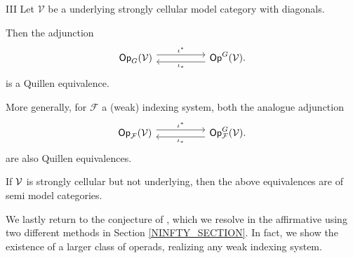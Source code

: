 \documentclass[a4paper,10pt]{article}%
\begin{document}
\begin{customthm}{III}\label{MAINQUILLENEQUIV THM}
Let $\mathcal{V}$ be a underlying strongly cellular model category with diagonals.

Then the adjunction 
\begin{equation}
\begin{tikzcd}[column sep =5em]
	\mathsf{Op}_G(\mathcal{V}) \ar[shift left=1.5]{r}{\iota^{\**}} 
	&
	\mathsf{Op}^G(\mathcal{V})
	\ar[shift left=1.5]{l}{\iota_{\**}} .
\end{tikzcd}
\end{equation}
is a Quillen equivalence.

More generally, for $\mathcal{F}$ a (weak) indexing system, both
the analogue adjunction
\begin{equation}
      \begin{tikzcd}[column sep =5em]
            \mathsf{Op}_{\mathcal F}(\mathcal{V}) 
            \ar[shift left=1.5]{r}{\iota^{\**}} 
            &
            \mathsf{Op}^G_{\mathcal{F}}(\mathcal{V})
            \ar[shift left=1.5]{l}{\iota_{\**}} .
      \end{tikzcd}
\end{equation}
are also Quillen equivalences.

\end{customthm}

If $\mathcal V$ is strongly cellular but not underlying, then the above equivalences are of semi model categories.

We lastly return to the conjecture of \cite{BH15}, which we resolve in the affirmative using two different methods in Section \ref{NINFTY_SECTION}. In fact, we show the existence of a larger class of operads, realizing any weak indexing system.
\end{document}
